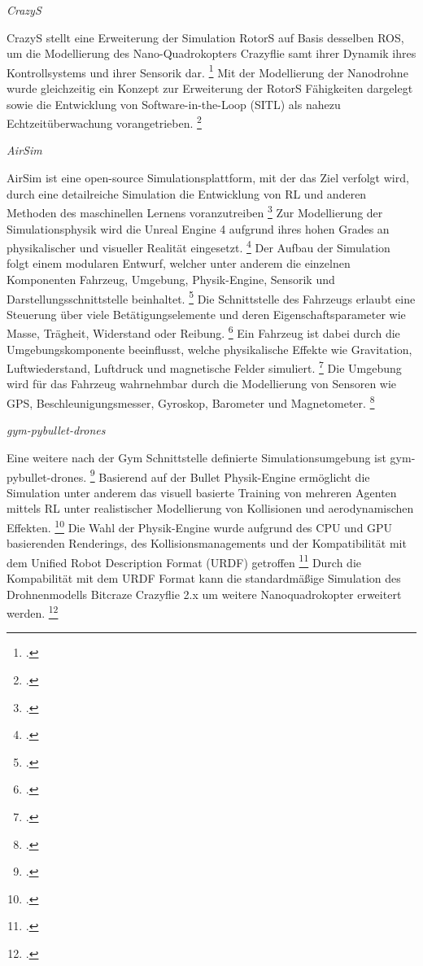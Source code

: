 \textit{CrazyS}

CrazyS stellt eine Erweiterung der Simulation RotorS auf Basis desselben ROS, um die Modellierung des Nano-Quadrokopters Crazyflie samt ihrer Dynamik ihres Kontrollsystems und ihrer Sensorik dar. \footcite[Vgl.][S. 81]{Silano.2020}
Mit der Modellierung der Nanodrohne wurde gleichzeitig ein Konzept zur Erweiterung der RotorS Fähigkeiten dargelegt sowie die Entwicklung von Software-in-the-Loop (SITL) als nahezu Echtzeitüberwachung vorangetrieben. \footcite[Vgl.][S. 82]{Silano.2020}

\textit{AirSim}

AirSim ist eine open-source Simulationsplattform, mit der das Ziel verfolgt wird, durch eine detailreiche Simulation die Entwicklung von RL und anderen Methoden des maschinellen Lernens voranzutreiben \footcite[Vgl.][S. 2]{Shah.2017}
Zur Modellierung der Simulationsphysik wird die Unreal Engine 4 aufgrund ihres hohen Grades an physikalischer und visueller Realität eingesetzt. \footcite[Vgl.][S. 1]{Shah.2017}
Der Aufbau der Simulation folgt einem modularen Entwurf, welcher unter anderem die einzelnen Komponenten Fahrzeug, Umgebung, Physik-Engine, Sensorik und Darstellungsschnittstelle beinhaltet. \footcite[Vgl.][S. 3]{Shah.2017}
Die Schnittstelle des Fahrzeugs erlaubt eine Steuerung über viele Betätigungselemente und deren Eigenschaftsparameter wie Masse, Trägheit, Widerstand oder Reibung. \footcite[Vgl.][S. 5]{Shah.2017}
Ein Fahrzeug ist dabei durch die Umgebungskomponente beeinflusst, welche physikalische Effekte wie Gravitation, Luftwiederstand, Luftdruck und magnetische Felder simuliert. \footcite[Vgl.][S. 6]{Shah.2017}
Die Umgebung wird für das Fahrzeug wahrnehmbar durch die Modellierung von Sensoren wie GPS, Beschleunigungsmesser, Gyroskop, Barometer und Magnetometer. \footcite[Vgl.][S. 9]{Shah.2017}


\textit{gym-pybullet-drones}

Eine weitere nach der Gym Schnittstelle definierte Simulationsumgebung ist gym-pybullet-drones. \footcite[Vgl.][S. 1]{Panerati.332021}
Basierend auf der Bullet Physik-Engine ermöglicht die Simulation unter anderem das visuell basierte Training von mehreren Agenten mittels RL unter realistischer Modellierung von Kollisionen und aerodynamischen Effekten. \footcite[Vgl.][S. 1]{Panerati.332021}
Die Wahl der Physik-Engine wurde aufgrund des CPU und GPU basierenden Renderings, des Kollisionsmanagements und der Kompatibilität mit dem Unified Robot Description Format (URDF) getroffen \footcite[Vgl.][S. 3]{Panerati.332021}
Durch die Kompabilität mit dem URDF Format kann die standardmäßige Simulation des Drohnenmodells Bitcraze Crazyflie 2.x um weitere Nanoquadrokopter erweitert werden. \footcite[Vgl.][S. 3]{Panerati.332021}
